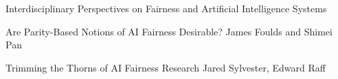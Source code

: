 \documentclass[11pt]{article}
\begin{document}
\begin{bulletin}
\begin{articlesection}{Interdisciplinary Perspectives on Fairness and Artificial Intelligence Systems}
\makeatletter
\renewcommand{\AB@affillist}{}
\renewcommand{\AB@authlist}{}
\setcounter{authors}{0}
\makeatother

\begin{article}
{Are Parity-Based Notions of AI Fairness Desirable?}
{James Foulds and Shimei Pan}
\graphicspath{{Submissions_FouldsPan/foulds_pan_final/figs/}}

\end{article}

\makeatletter
\renewcommand{\AB@affillist}{}
\renewcommand{\AB@authlist}{}
\setcounter{authors}{0}
\makeatother

\begin{article}
{Trimming the Thorns of AI Fairness Research}
{Jared Sylvester, Edward Raff}
\graphicspath{{Submissions_FouldsPan/sylvester_raff_final/}}

\end{article}

\end{articlesection}




%
%



\begin{callsection}


\end{callsection}
\end{bulletin}
\end{document}
